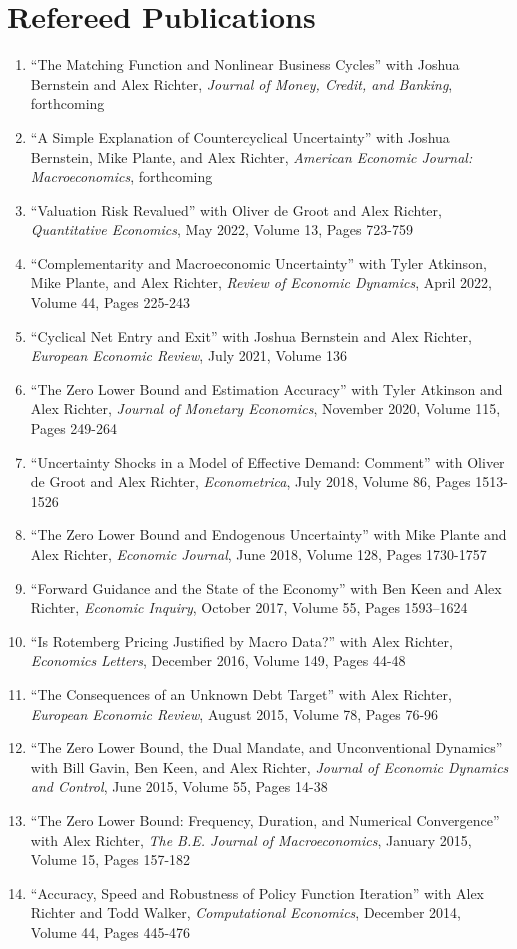 \documentclass[10pt,letterpaper,en-US]{article}
\begin{document}
\section*{Refereed Publications}
\begin{enumerate}
\item ``The Matching Function and Nonlinear Business Cycles'' with Joshua Bernstein and Alex Richter, \emph{Journal of Money, Credit, and Banking}, forthcoming
\item ``A Simple Explanation of Countercyclical Uncertainty'' with Joshua Bernstein, Mike Plante, and Alex Richter, \emph{American Economic Journal: Macroeconomics}, forthcoming
\item ``Valuation Risk Revalued'' with Oliver de Groot and Alex Richter, \emph{Quantitative Economics}, May 2022, Volume 13, Pages 723-759
\item ``Complementarity and Macroeconomic Uncertainty'' with Tyler Atkinson, Mike Plante, and Alex Richter, \emph{Review of Economic Dynamics}, April 2022, Volume 44, Pages 225-243
\item ``Cyclical Net Entry and Exit'' with Joshua Bernstein and Alex Richter, \emph{European Economic Review}, July 2021, Volume 136
\item ``The Zero Lower Bound and Estimation Accuracy'' with Tyler Atkinson and Alex Richter, \emph{Journal of Monetary Economics}, November 2020, Volume 115, Pages 249-264
\item ``Uncertainty Shocks in a Model of Effective Demand: Comment'' with Oliver de Groot and Alex Richter, \emph{Econometrica}, July 2018, Volume 86, Pages 1513-1526
\item ``The Zero Lower Bound and Endogenous Uncertainty'' with Mike Plante and Alex Richter, \emph{Economic Journal}, June 2018, Volume 128, Pages 1730-1757
\item ``Forward Guidance and the State of the Economy'' with Ben Keen and Alex Richter, \emph{Economic Inquiry}, October 2017, Volume 55, Pages 1593–1624
\item ``Is Rotemberg Pricing Justified by Macro Data?'' with Alex Richter, \emph{Economics Letters}, December 2016, Volume 149, Pages 44-48
\item ``The Consequences of an Unknown Debt Target'' with Alex Richter, \emph{European Economic Review}, August 2015, Volume 78, Pages 76-96
\item ``The Zero Lower Bound, the Dual Mandate, and Unconventional Dynamics'' with Bill Gavin, Ben Keen, and Alex Richter, \emph{Journal of Economic Dynamics and Control}, June 2015, Volume 55, Pages 14-38
\item ``The Zero Lower Bound: Frequency, Duration, and Numerical Convergence'' with Alex Richter, \emph{The B.E. Journal of Macroeconomics}, January 2015, Volume 15, Pages 157-182
\item ``Accuracy, Speed and Robustness of Policy Function Iteration'' with Alex Richter and Todd Walker, \emph{Computational Economics}, December 2014, Volume 44, Pages 445-476
\end{enumerate}
\end{document}
